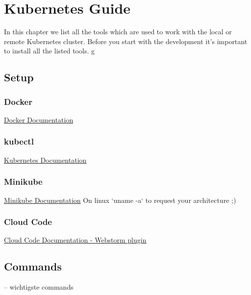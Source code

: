 \chapter{Kubernetes Guide}
\label{chap: kubernetes-guide}

In this chapter we list all the tools which are used to work with the local or remote Kubernetes cluster. Before you start with the development it's important to install all the listed tools.
g
\section{Setup}
\subsection{Docker}
\href{https://docs.docker.com/get-docker/}{Docker Documentation}

\subsection{kubectl}
\href{https://kubernetes.io/docs/tasks/tools/#kubectl}{Kubernetes Documentation}

\subsection{Minikube}
\href{https://minikube.sigs.k8s.io/docs/start/}{Minikube Documentation} \newline
On linux `uname -a` to request your architecture ;)

\subsection{Cloud Code}
\href{https://plugins.jetbrains.com/plugin/8079-cloud-code/}{Cloud Code Documentation - Webstorm plugin}

\section{Commands}
-- wichtigste commands
